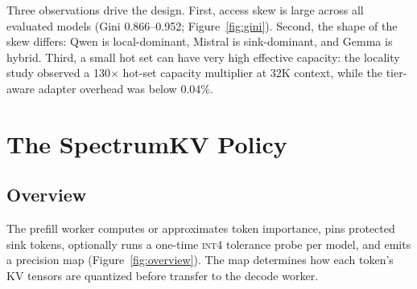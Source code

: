 \documentclass[11pt]{article}
\newcommand{\method}{SpectrumKV}
\newcommand{\pct}{\%}
\newcommand{\intiv}{\textsc{int4}}
\theoremstyle{plain}
\theoremstyle{definition}
\begin{document}
Three observations drive the design.  First, access skew is large across all evaluated models (Gini 0.866--0.952; Figure~\ref{fig:gini}).  Second, the shape of the skew differs: Qwen is local-dominant, Mistral is sink-dominant, and Gemma is hybrid.  Third, a small hot set can have very high effective capacity: the locality study observed a 130$\times$ hot-set capacity multiplier at 32K context, while the tier-aware adapter overhead was below 0.04\pct{}.

\section{The \method{} Policy}
\label{sec:method}

\subsection{Overview}
The prefill worker computes or approximates token importance, pins protected sink tokens, optionally runs a one-time \intiv{} tolerance probe per model, and emits a precision map (Figure~\ref{fig:overview}).  The map determines how each token's KV tensors are quantized before transfer to the decode worker.
\end{document}

